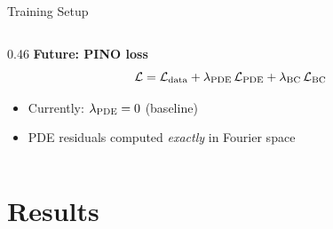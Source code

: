 \documentclass[aspectratio=169,12pt]{beamer}
\newcommand{\loss}{\mathcal{L}}
\begin{document}
\begin{frame}{Training Setup}
\begin{columns}[T]
\begin{column}{0.46\textwidth}
      \vspace{8pt}
      \textbf{Future: PINO loss}
      \[
        \loss = \loss_{\rm data}
               + \lambda_{\rm PDE}\,\loss_{\rm PDE}
               + \lambda_{\rm BC}\,\loss_{\rm BC}
      \]
      \begin{itemize}
        \item Currently: $\lambda_{\rm PDE}=0$ (baseline)
        \item PDE residuals computed \textit{exactly} in Fourier space
      \end{itemize}
    \end{column}
  \end{columns}
\end{frame}

\section{Results}
\end{document}
